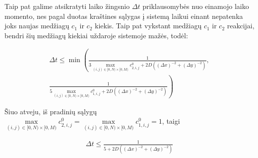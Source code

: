 \documentclass{VUMIFInfKursinis}
\begin{document}
Taip pat galime atsikratyti laiko žingsnio $\Delta t$ priklausomybės nuo einamojo laiko momento, nes
pagal duotas kraštines sąlygas į sistemą laikui einant nepatenka joks naujas medžiagų $c_1$ ir $c_2$ kiekis.
Taip pat vykstant medžiagų $c_1$ ir $c_2$ reakcijai, bendri šių medžiagų kiekiai uždaroje sistemoje mažės, todėl:

\begin{align*}
    \Delta t\leq\min\left(
        \frac{1}{3\max\limits_{(i,j)\in[0,N)\times[0,M)}c^{0}_{2,i,j}
        +2D\left((\Delta x)^{-2}+(\Delta y)^{-2}\right)},\right. \\
        \left. \frac{1}{5\max\limits_{(i,j)\in[0,N)\times[0,M)}c^{0}_{1,i,j}
        +2D\left((\Delta x)^{-2}+(\Delta y)^{-2}\right)}
    \right)
\end{align*}

Šiuo atveju, iš pradinių sąlygų $\max\limits_{(i,j)\in[0,N)\times[0,M)}c^{0}_{2,i,j}=\max\limits_{(i,j)\in[0,N)\times[0,M)}c^{0}_{1,i,j}=1$, taigi

\begin{align*}
    \Delta t\leq\frac{1}{5+2D\left((\Delta x)^{-2}+(\Delta y)^{-2}\right)}
\end{align*}



\printbibliography[heading=bibintoc] %
\end{document}
